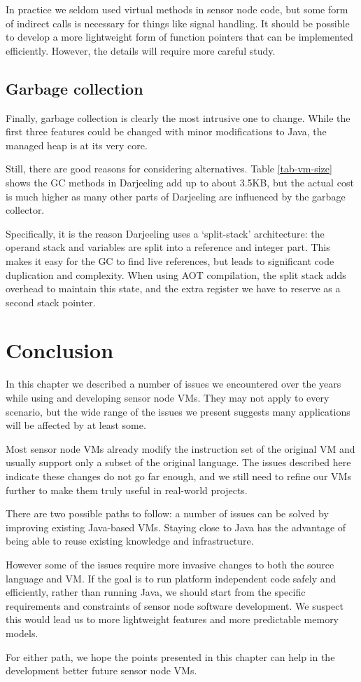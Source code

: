 In practice we seldom used virtual methods in sensor node code, but some form of indirect calls is necessary for things like signal handling. It should be possible to develop a more lightweight form of function pointers that can be implemented efficiently. However, the details will require more careful study.


\subsection{Garbage collection}
Finally, garbage collection is clearly the most intrusive one to change. While the first three features could be changed with minor modifications to Java, the managed heap is at its very core.

Still, there are good reasons for considering alternatives. Table \ref{tab-vm-size} shows the GC methods in Darjeeling add up to about 3.5KB, but the actual cost is much higher as many other parts of Darjeeling are influenced by the garbage collector.

Specifically, it is the reason Darjeeling uses a `split-stack' architecture: the operand stack and variables are split into a reference and integer part. This makes it easy for the GC to find live references, but leads to significant code duplication and complexity. When using AOT compilation, the split stack adds overhead to maintain this state, and the extra register we have to reserve as a second stack pointer.




\section{Conclusion}
In this chapter we described a number of issues we encountered over the years while using and developing sensor node VMs. They may not apply to every scenario, but the wide range of the issues we present suggests many applications will be affected by at least some.

Most sensor node VMs already modify the instruction set of the original VM and usually support only a subset of the original language. The issues described here indicate these changes do not go far enough, and we still need to refine our VMs further to make them truly useful in real-world projects.

There are two possible paths to follow: a number of issues can be solved by improving existing Java-based VMs. Staying close to Java has the advantage of being able to reuse existing knowledge and infrastructure.

However some of the issues require more invasive changes to both the source language and VM. If the goal is to run platform independent code safely and efficiently, rather than running Java, we should start from the specific requirements and constraints of sensor node software development. We suspect this would lead us to more lightweight features and more predictable memory models.

For either path, we hope the points presented in this chapter can help in the development better future sensor node VMs.
